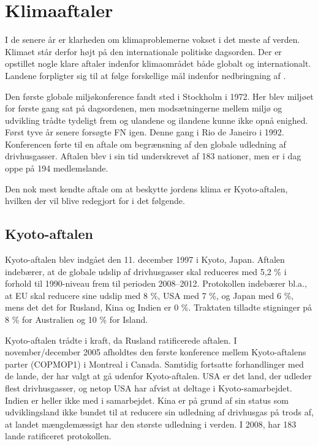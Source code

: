 \chapter{Klimaaftaler}

I de senere år er klarheden om klimaproblemerne vokset i det meste af verden. Klimaet står derfor højt på den internationale politiske dagsorden. Der er opstillet nogle klare aftaler indenfor klimaområdet både globalt og internationalt. Landene forpligter sig til at følge forskellige mål indenfor nedbringning af .

Den første globale miljøkonference fandt sted i Stockholm i 1972. Her blev miljøet for første gang sat på dagsordenen, men modsætningerne mellem miljø og udvikling trådte tydeligt frem og ulandene og ilandene kunne ikke opnå enighed. Først tyve år senere forsøgte FN igen. Denne gang i Rio de Janeiro i 1992. Konferencen førte til en aftale om begrænsning af den globale udledning af drivhusgasser. Aftalen blev i sin
tid underskrevet af 183 nationer, men er i dag oppe på 194 medlemslande.

Den nok mest kendte aftale om at beskytte jordens klima er Kyoto-aftalen, hvilken der vil blive redegjort for i det følgende.

\section{Kyoto-aftalen}

Kyoto-aftalen blev indgået den 11. december 1997 i Kyoto, Japan. Aftalen indebærer, at de globale udslip af drivhusgasser skal reduceres med 5,2 \% i forhold til 1990-niveau frem til perioden 2008–2012. Protokollen indebærer bl.a., at EU skal reducere sine udslip med 8 \%, USA med 7 \%, og Japan med 6 \%, mens det det for Rusland, Kina og Indien er 0 \%. Traktaten tilladte stigninger på 8 \% for Australien og 10 \% for Island.

Kyoto-aftalen trådte i kraft, da Rusland ratificerede aftalen. I november/december 2005 afholdtes den første konference mellem Kyoto-aftalens parter (COPMOP1) i Montreal i Canada. Samtidig fortsatte forhandlinger med de lande, der har valgt at gå udenfor Kyoto-aftalen. USA er det land, der udleder flest drivhusgasser, og netop USA har afvist at deltage i Kyoto-samarbejdet. Indien er heller ikke med i samarbejdet. Kina er på grund af sin status som udviklingsland ikke bundet til at reducere sin udledning af drivhusgas på trods af, at landet mængdemæssigt har den største udledning i verden. I 2008, har 183 lande ratificeret protokollen.

